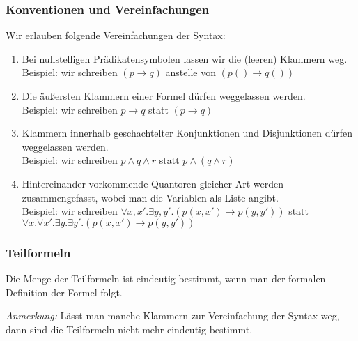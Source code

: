 \documentclass[aspectratio=1610,onlymath]{beamer}
\begin{document}
\begin{frame}\frametitle{Konventionen und Vereinfachungen}

Wir erlauben folgende \alert{Vereinfachungen der Syntax:}\pause
\begin{enumerate}[(1)]
\item Bei nullstelligen Prädikatensymbolen lassen wir die (leeren) Klammern weg.\\
Beispiel: wir schreiben $(p\to q)$ anstelle von $(p()\to q())$\pause
%
\item Die äußersten Klammern einer Formel dürfen weggelassen werden.\\
Beispiel: wir schreiben $p\to q$ statt $(p\to q)$\pause
%
\item Klammern innerhalb geschachtelter Konjunktionen und Disjunktionen dürfen
weggelassen werden.\\
Beispiel: wir schreiben $p\wedge q\wedge r$ statt $p\wedge (q\wedge r)$\pause
%
\item Hintereinander vorkommende Quantoren gleicher Art werden zusammengefasst, wobei man die Variablen als Liste angibt.\\
Beispiel: wir schreiben $\forall x,x'.\exists y,y'.(p(x,x')\to p(y,y'))$ statt $\forall x.\forall x'.\exists y.\exists y'.(p(x,x')\to p(y,y'))$\pause
\end{enumerate}


\end{frame}


\begin{frame}\frametitle{Teilformeln}


Die Menge der Teilformeln ist eindeutig bestimmt, wenn man der formalen 
Definition der Formel folgt.


\pause\emph{Anmerkung:} Lässt man manche Klammern zur Vereinfachung der Syntax weg, dann 
sind die Teilformeln nicht mehr eindeutig bestimmt.


\end{frame}
\end{document}
